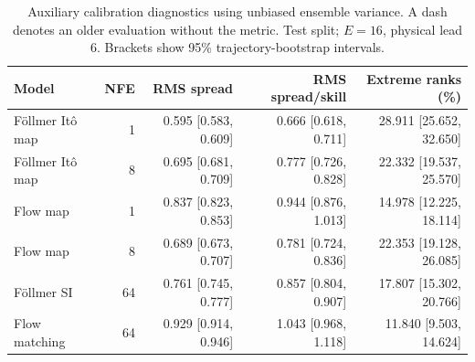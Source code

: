 \begin{table}[t]
\centering
\small
\setlength{\tabcolsep}{3pt}
\caption{Auxiliary calibration diagnostics using unbiased ensemble variance. A dash denotes an older evaluation without the metric. Test split; $E=16$, physical lead 6. Brackets show 95\% trajectory-bootstrap intervals.}
\label{tab:map-rms-calibration}
\begin{tabular}{lrrrr}
\toprule
Model & NFE & RMS spread & RMS spread/skill & Extreme ranks (\%) \\
\midrule
Föllmer Itô map & 1 & 0.595 [0.583, 0.609] & 0.666 [0.618, 0.711] & 28.911 [25.652, 32.650] \\
Föllmer Itô map & 8 & 0.695 [0.681, 0.709] & 0.777 [0.726, 0.828] & 22.332 [19.537, 25.570] \\
\addlinespace
Flow map & 1 & 0.837 [0.823, 0.853] & 0.944 [0.876, 1.013] & 14.978 [12.225, 18.114] \\
Flow map & 8 & 0.689 [0.673, 0.707] & 0.781 [0.724, 0.836] & 22.353 [19.128, 26.085] \\
\addlinespace
Föllmer SI & 64 & 0.761 [0.745, 0.777] & 0.857 [0.804, 0.907] & 17.807 [15.302, 20.766] \\
\addlinespace
Flow matching & 64 & 0.929 [0.914, 0.946] & 1.043 [0.968, 1.118] & 11.840 [9.503, 14.624] \\
\bottomrule
\end{tabular}
\end{table}
